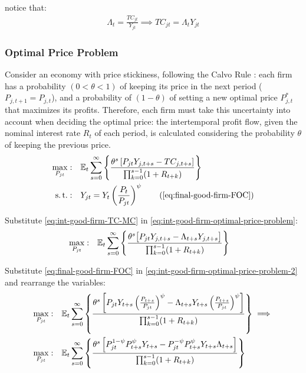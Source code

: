 \documentclass[
thesis.tex
]{subfiles}
\begin{document}
	notice that:
	\begin{align}
		\label{eq:int-good-firm-TC-MC}
		\Lambda_t = \frac{TC_{jt}}{Y_{jt}} \implies 
		TC_{jt} = \Lambda_t Y_{jt}
	\end{align}
	
	
	\subsubsection*{Optimal Price Problem}
	
	Consider an economy with price stickiness, following the Calvo Rule \cite{calvo_staggered_1983}: each firm has a probability $(0 < \theta < 1)$ of keeping its price in the next period ($P_{j,t+1} = P_{j,t}$), and a probability of $(1 - \theta)$ of setting a new optimal price $P_{j,t}^\ast$ that maximizes its profits. Therefore, each firm must take this uncertainty into account when deciding the optimal price: the intertemporal profit flow, given the nominal interest rate $R_t$ of each period, is calculated considering the probability $\theta$ of keeping the previous price.
	\begin{align}
		\max_{P_{jt}}: & \quad \E \sum_{s=0}^{\infty} \left\{ \frac{ \theta^s \left[ P_{jt} Y_{j,t+s} - TC_{j,t+s} \right] }{\prod_{k=0}^{s-1}(1+R_{t+k})} \right\} \label{eq:int-good-firm-optimal-price-problem} \\
		\st: & \quad Y_{jt} = Y_t \left( \frac{P_t}{P_{jt}} \right)^{\psi} \tag{\ref{eq:final-good-firm-FOC}}
	\end{align}
	
	
	Substitute \ref{eq:int-good-firm-TC-MC} in \ref{eq:int-good-firm-optimal-price-problem}:
	\begin{align}
		\label{eq:int-good-firm-optimal-price-problem-2}
		\max_{P_{jt}}: & \quad {\mathbb{E}_{t}} \sum_{s=0}^{\infty} \left\{ \frac{\theta^s \big[ P_{jt} Y_{j,t+s} - \Lambda_{t+s} Y_{j,t+s} \big]}{\prod_{k=0}^{s-1}(1+R_{t+k})} \right\}
	\end{align}
	
	Substitute \ref{eq:final-good-firm-FOC} in \ref{eq:int-good-firm-optimal-price-problem-2} and rearrange the variables:
	\begin{align}
		\max_{P_{jt}}: & \quad {\mathbb{E}_{t}} \sum_{s=0}^{\infty} \left\{ \frac{\theta^s \left[ P_{jt} Y_{t+s} \left( \frac{P_{t+s}}{P_{jt}} \right)^{\psi} - \Lambda_{t+s} Y_{t+s} \left( \frac{P_{t+s}}{P_{jt}} \right)^{\psi} \right] }{\prod_{k=0}^{s-1}(1+R_{t+k})} \right\} \implies \nonumber 
		\\
		\max_{P_{jt}}: & \quad {\mathbb{E}_{t}} \sum_{s=0}^{\infty} \left\{ \frac{\theta^s \left[ P_{jt}^{1-\psi} P_{t+s}^{\psi} Y_{t+s} - P_{jt}^{-\psi} P_{t+s}^{\psi} Y_{t+s} \Lambda_{t+s} \right] }{\prod_{k=0}^{s-1}(1+R_{t+k})} \right\} \nonumber
	\end{align}
	
\end{document}

